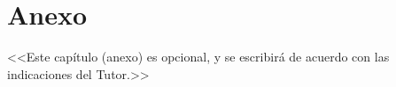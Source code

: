 \chapter{Anexo} \label{chp:anexo}

<<Este capítulo (anexo) es opcional, y se escribirá de acuerdo con las indicaciones del Tutor.>>
